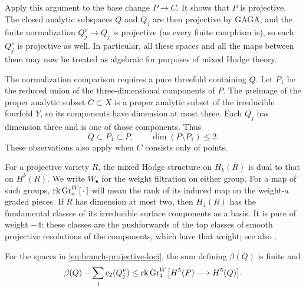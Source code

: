 Apply this argument to the base change $P\to C$.  It shows that $P$
is projective.  The closed analytic subspaces $Q$ and $Q_j$ are then
projective by GAGA, and the finite normalization $Q_j^\nu\to Q_j$
is projective (as every finite morphism is), so each $Q_j^\nu$ is
projective as well.  In particular,
all these spaces and all the maps between them may now be treated as
algebraic for purposes of mixed Hodge theory.

The normalization comparison requires a pure threefold containing $Q$.
Let $P_1$ be the reduced union of the three-dimensional components of
$P$.  The preimage of the proper analytic subset $C\subset X$ is a
proper analytic subset of the irreducible fourfold $Y$, so its
components have dimension at most three.  Each $Q_j$ has dimension
three and is one of those components.  Thus
\[
 Q\subset P_1\subset P,\qquad \dim(P\setminus P_1)\leq2.
\]
These observations also apply when $C$ consists only of points.

For a projective variety $R$, the mixed Hodge structure on $H_k(R)$
is dual to that on $H^k(R)$.  We write $W_\bullet$ for the weight
filtration on either group.  For a map of such groups,
$\operatorname{rk}\operatorname{Gr}^W_a[\,\cdot\,]$ will mean the rank of its induced map on the
weight-$a$ graded pieces.  If $R$ has dimension at most two, then
$H_4(R)$ has the fundamental classes of its irreducible surface
components as a basis.  It is pure of weight $-4$: these classes are
the pushforwards of the top classes of smooth projective resolutions
of the components, which have that weight; see also
\cite[Theorem~8.2.4(ii)--(iii)]{DeligneHodgeIII}.

\begin{lemma}\label{lem:branch-normalization}
For the spaces in \eqref{eq:branch-projective-loci}, the sum defining
$\beta(Q)$ is finite and
\begin{equation}\label{eq:branch-normalization-bound}
 \beta(Q)-\sum_jc_2(Q_j^\nu)
 \leq \operatorname{rk}\operatorname{Gr}^W_4\bigl[H^5(P)\longrightarrow H^5(Q)\bigr].
\end{equation}
\end{lemma}

